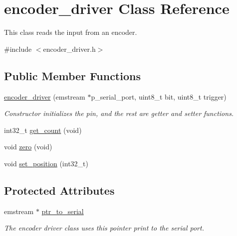 \hypertarget{classencoder__driver}{\section{encoder\-\_\-driver \-Class \-Reference}
\label{classencoder__driver}
}


\-This class reads the input from an encoder.  




{\ttfamily \#include $<$encoder\-\_\-driver.\-h$>$}

\subsection*{\-Public \-Member \-Functions}
\begin{DoxyCompactItemize}
\item 
\hyperlink{classencoder__driver_ad124387e5bdf6602f0222999cf1f198f}{encoder\-\_\-driver} (emstream $\ast$p\-\_\-serial\-\_\-port, uint8\-\_\-t bit, uint8\-\_\-t trigger)
\begin{DoxyCompactList}\small\item\em \-Constructor initializes the pin, and the rest are getter and setter functions. \end{DoxyCompactList}\item 
int32\-\_\-t \hyperlink{classencoder__driver_acdf13e85a1fd7125689d07eb6f3f5711}{get\-\_\-count} (void)
\item 
void \hyperlink{classencoder__driver_a54528af7d72cc2f707f7ff20a1bc4a2e}{zero} (void)
\item 
void \hyperlink{classencoder__driver_a7ebf72a7925dcf4ef341b5980c1bf68b}{set\-\_\-position} (int32\-\_\-t)
\end{DoxyCompactItemize}
\subsection*{\-Protected \-Attributes}
\begin{DoxyCompactItemize}
\item 
\hypertarget{classencoder__driver_a753c05178378d4e7961938175c35e8ee}{emstream $\ast$ \hyperlink{classencoder__driver_a753c05178378d4e7961938175c35e8ee}{ptr\-\_\-to\-\_\-serial}}\label{classencoder__driver_a753c05178378d4e7961938175c35e8ee}

\begin{DoxyCompactList}\small\item\em \-The encoder driver class uses this pointer print to the serial port. \end{DoxyCompactList}\end{DoxyCompactItemize}



